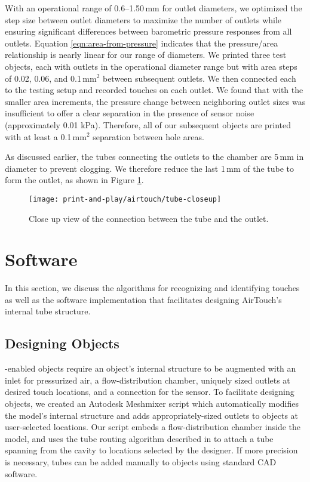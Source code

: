 				With an operational range of 0.6--1.50\,mm for outlet diameters, we
				optimized the step size between outlet diameters to maximize the number
				of outlets while ensuring significant differences between barometric
				pressure responses from all outlets. Equation
				\ref{eqn:area-from-pressure} indicates that the pressure/area
				relationship is nearly linear for our range of diameters. We printed
				three test objects, each with outlets in the operational diameter range
				but with area steps of 0.02, 0.06, and 0.1\,mm$^2$ between subsequent
				outlets. We then connected each to the testing setup and recorded
				touches on each outlet. We found that with the smaller area increments,
				the pressure change between neighboring outlet sizes was insufficient to
				offer a clear separation in the presence of sensor noise (approximately
				0.01 kPa). Therefore, all of our subsequent objects are printed with at
				least a 0.1\,mm$^2$ separation between hole areas.
            
				As discussed earlier, the tubes connecting the outlets to the chamber
				are 5\,mm in diameter to prevent clogging. We therefore reduce the last
				1\,mm of the tube to form the outlet, as shown in Figure
				\ref{fig:tube-reduction}.        

    		\begin{figure}
    			\centering
    			\texttt{[image: print-and-play/airtouch/tube-closeup]}
    			\caption{Close up view of the connection between the tube and the
						outlet.}
    			\label{fig:tube-reduction}
    		\end{figure}

	\section{Software}
		In this section, we discuss the algorithms for recognizing and identifying
		touches as well as the software implementation that facilitates designing
		AirTouch's internal tube structure.

		\subsection{Designing \at Objects}
			\at-enabled objects require an object's internal structure to be augmented
			with an inlet for pressurized air, a flow-distribution chamber, uniquely
			sized outlets at desired touch locations, and a connection for the sensor.
			To facilitate designing \at objects, we created an Autodesk Meshmixer
			script which automatically modifies the model's internal structure and
			adds appropriately-sized outlets to objects at user-selected locations.
			Our script embeds a flow-distribution chamber inside the model, and uses
			the tube routing algorithm described in \cite{Savage:2014} to attach a
			tube spanning from the cavity to locations selected by the designer. If
			more precision is necessary, tubes can be added manually to objects using
			standard CAD software.

